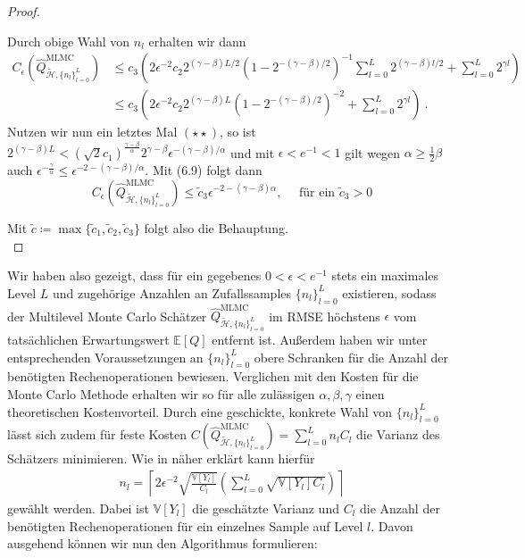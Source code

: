\begin{proof}
\begin{enumerate}[label=(\roman*)]
\[		\]
		Durch obige Wahl von $ n_l $ erhalten wir dann 
		\begin{align*}
			C_{\epsilon}(\widehat{Q}_{\tilde{\mathcal{H}},\{ n_l \}_{l=0}^L }^{\text{MLMC}}) &\leq c_3 \left( 2\epsilon^{-2} c_2 2^{(\gamma-\beta)L/2}(1-2^{-(\gamma-\beta)/2})^{-1} \sum_{l=0}^L 2^{(\gamma -\beta)l/2} + \sum_{l=0}^L 2^{\gamma l} \right) \\
			&\leq c_3 \left( 2\epsilon^{-2} c_2 2^{(\gamma-\beta)L}(1-2^{-(\gamma-\beta)/2})^{-2}  + \sum_{l=0}^L 2^{\gamma l} \right) \ .
		\end{align*}
		Nutzen wir nun ein letztes Mal $ (\star \star) $, so ist $ 2^{(\gamma-\beta)L} < \left( \sqrt{2}c_1 \right)^{\frac{\gamma-\beta}{\alpha}} 2^{\gamma-\beta} \epsilon^{-(\gamma-\beta)/\alpha} $ und mit $ \epsilon < e^{-1} < 1 $ gilt wegen $ \alpha \geq \frac{1}{2}\beta $ auch $ \epsilon^{-\frac{\gamma}{\alpha}} \leq \epsilon^{-2 -(\gamma - \beta)/\alpha} $.
		Mit (6.9) folgt dann 
		\[
		C_{\epsilon}(\widehat{Q}_{\tilde{\mathcal{H}},\{ n_l \}_{l=0}^L }^{\text{MLMC}}) \leq \tilde{c}_3 \epsilon^{-2-(\gamma-\beta)\alpha} , \quad \text{  für ein } \tilde{c}_3>0
		\]
	\end{enumerate}
	Mit $ \tilde{c} \coloneqq \max\{\tilde{c}_1,\tilde{c}_2,\tilde{c}_3\} $ folgt also die Behauptung.\\
\end{proof}
Wir haben also gezeigt, dass für ein gegebenes $ 0 < \epsilon < e^{-1} $ stets ein maximales Level $ L $ und zugehörige Anzahlen an Zufallssamples $ \{n_l\}_{l=0}^L $
existieren, sodass der Multilevel Monte Carlo Schätzer $ \widehat{Q}_{\tilde{\mathcal{H}},\{ n_l \}_{l=0}^L }^{\text{MLMC}} $ im RMSE höchstens $ \epsilon $ vom tatsächlichen Erwartungswert $ \mathbb{E}[Q] $ entfernt ist. Außerdem haben wir unter entsprechenden Voraussetzungen an $ \{n_l\}_{l=0}^L $ obere Schranken für die Anzahl der benötigten Rechenoperationen bewiesen.
Verglichen mit den Kosten für die Monte Carlo Methode erhalten wir so für alle zulässigen $ \alpha,\beta,\gamma $ einen theoretischen Kostenvorteil. 
Durch eine geschickte, konkrete Wahl von $ \{n_l\}_{l=0}^L $ lässt sich zudem für feste Kosten $ C(\widehat{Q}_{\tilde{\mathcal{H}},\{ n_l \}_{l=0}^L }^{\text{MLMC}} ) = \sum_{l=0}^{L} n_l C_l$ die Varianz des Schätzers minimieren.
Wie in \cite{giles_2015} näher erklärt kann hierfür 
\begin{align}
	\label{OptimalN}
	n_l = \left\lceil 2 \epsilon^{-2} \sqrt{\frac{\mathbb{V}[Y_l]}{C_l}} \left( \sum_{l=0}^{L}\sqrt{\mathbb{V}[Y_l]C_l} \right) \right\rceil
\end{align}
gewählt werden. Dabei ist $ \mathbb{V}[Y_l] $ die geschätzte Varianz und $ C_l $ die Anzahl der benötigten Rechenoperationen für ein einzelnes Sample auf Level $ l $.
Davon ausgehend können wir nun den Algorithmus formulieren:


